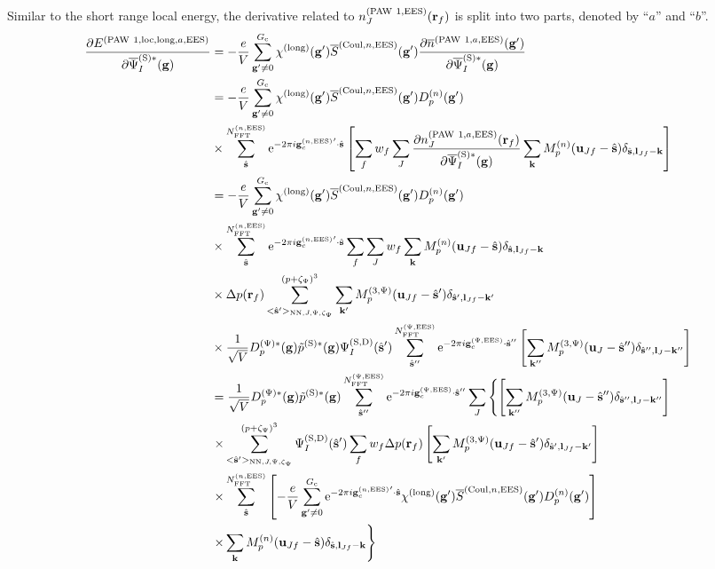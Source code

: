 \documentclass[paper=a4, fontsize=11pt]{article} %
\numberwithin{equation}{section} %
\numberwithin{figure}{section} %
\numberwithin{table}{section} %
\newcommand{\p}{\partial}
\newcommand{\ol}{\overline}
\newcommand{\bu}{{\bf{u}}}
\newcommand{\bl}{{\bf{l}}}
\newcommand{\bk}{{\bf{k}}}
\newcommand{\bs}{{\bf{s}}}
\newcommand{\bg}{{\bf{g}}}
\newcommand{\br}{{\bf{r}}}
\newcommand{\hs}{{\hat{\bf{s}}}}
\newcommand{\rS}{{\mathrm{S}}}
\newcommand{\rEES}{{\mathrm{EES}}}
\newcommand{\rNN}{{\mathrm{NN}}}
\newcommand{\re}{{\mathrm{e}}}
\newcommand{\rCo}{{\mathrm{Coul}}}
\newcommand{\rlong}{{\mathrm{long}}}
\newcommand{\rP}{{\mathrm{PAW}}}
\newcommand{\rD}{{\mathrm{D}}}
\newcommand{\rlo}{{\mathrm{loc}}}
\newcommand{\gcpEES}{{\bg_c^{(\Psi,\rEES)}}}
\newcommand{\gcnEES}{{\bg_c^{(n,\rEES)}}}
\newcommand{\psigsc}{{\overline \Psi_I^{(\rS)*}(\bg)}}
\newcommand{\NFFTnEES}{{N^{(n,\rEES)}_{\mathrm{FFT}}}}
\newcommand{\NFFTpEES}{{N^{\mathrm{(\Psi,\rEES})}_{\mathrm{FFT}}}}
\newcommand{\Gc}{{G_{\mathrm{c}}}}
\newcommand{\Dpgc}{{D^{(\Psi)*}_p(\bg)}}
\newcommand{\Mp}{{M_p^{(3,\Psi)}}}
\newcommand{\pzp}{{(p+\zeta_{\Psi})^3}}
\newcommand{\hspJp}{{<\hs'>_{\rNN,J,\Psi,\zeta_\Psi}}}
\begin{document}
Similar to the short range local energy, the derivative related to $n_J^{(\rP\ 1,\rEES)}(\br_f)$ is split into two parts, denoted by ``$a$'' and ``$b$''.
\begin{equation}
\begin{split}
\frac{\p E^{(\rP\ 1,\rlo,\rlong,a,\rEES)}}{ \p \psigsc}
&= - \frac{e}{V} \sum_{\bg' \neq 0}^{\Gc} \chi^{(\rlong)}(\bg')  \ol S^{(\rCo,n,\rEES)}(\bg') \frac{\p \ol n^{(\rP\ 1,a,\rEES)}(\bg')}{\p \psigsc} \\
&=  - \frac{e}{V} \sum_{\bg' \neq 0}^{\Gc} \chi^{(\rlong)}(\bg')  \ol S^{(\rCo,n,\rEES)}(\bg') D_p^{(n)}(\bg') \\
&\times \sum_{\hat \bs}^\NFFTnEES \re^{-2\pi i\gcnEES' \cdot \hat\bs}\left[\sum_f w_f \sum_J \frac{\p n_J^{(\rP\ 1,a,\rEES)}(\br_f) }{\p \psigsc}\sum_{\bk}  M_p^{(n)}(\bu_{Jf}-\hat \bs)\delta_{\hat \bs,\bl_{Jf}-\bk}\right] \\
&= -\frac{e}{V} \sum_{\bg' \neq 0}^{\Gc} \chi^{(\rlong)}(\bg')  \ol S^{(\rCo,n,\rEES)}(\bg') D_p^{(n)}(\bg') \\
&\times \sum_{\hat \bs}^\NFFTnEES \re^{-2\pi i\gcnEES' \cdot \hat\bs} \sum_f  \sum_J w_f \sum_{\bk}  M_p^{(n)}(\bu_{Jf}-\hat \bs)\delta_{\hat \bs,\bl_{Jf}-\bk} \\
&\times \Delta p(\br_f)\sum_{\hspJp}^\pzp \sum_{\bk'} \Mp(\bu_{Jf}-\hat \bs')\delta_{\hat \bs',\bl_{Jf}-\bk'} \\
&\times \frac{1}{\sqrt{V}} \Dpgc\tilde p^{(\rS)*}(\bg) \Psi_{I}^{(\rS,\rD)}(\hat \bs') \sum_{\hat \bs''}^\NFFTpEES\re^{-2\pi i\gcpEES \cdot \hat\bs''} \left[\sum_{\bk''} \Mp(\bu_{J}-\hat \bs'') \delta_{\hat \bs'',\bl_J-\bk''}\right] \\
&= \frac{1}{\sqrt{V}} \Dpgc\tilde p^{(\rS)*}(\bg) \sum_{\hat \bs''}^\NFFTpEES \re^{-2\pi i\gcpEES \cdot \hat\bs''} \sum_J \left\{\left[\sum_{\bk''} \Mp(\bu_{J}-\hat \bs'') \delta_{\hat \bs'',\bl_J-\bk''}\right]\right.\\
&\left.\times \sum_{\hspJp}^\pzp \Psi_{I}^{(\rS,\rD)}(\hat \bs') \sum_f w_f \Delta p(\br_f)  \left[\sum_{\bk'}  \Mp(\bu_{Jf}-\hat \bs')\delta_{\hat \bs',\bl_{Jf}-\bk'}\right]\right. \\
&\left.\times \sum_{\hat \bs}^\NFFTnEES \left[-\frac{e}{V} \sum_{\bg' \neq 0}^{\Gc}\re^{-2\pi i\gcnEES' \cdot \hat\bs} \chi^{(\rlong)}(\bg')  \ol S^{(\rCo,n,\rEES)}(\bg') D_p^{(n)}(\bg')\right]\right. \\
&\left.\times \sum_{\bk}  M_p^{(n)}(\bu_{Jf}-\hat \bs)\delta_{\hat \bs,\bl_{Jf}-\bk}\right\} \\
\end{split}
\end{equation}
\end{document}

